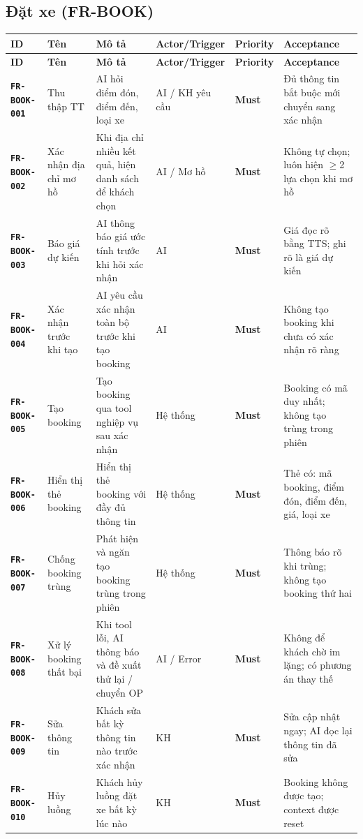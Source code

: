 \documentclass[12pt,a4paper]{article}
\newcommand{\reqid}[1]{\texttt{\textbf{\color{AloBlue}#1}}}
\newcommand{\musthave}{\colorbox{PrioMust}{\small\textbf{Must}}}
\begin{document}
\subsection{Đặt xe (FR-BOOK)}
\begin{longtable}{L{2.2cm} L{2.2cm} L{3.8cm} L{2.8cm} C{1.5cm} L{3cm}}
  \toprule{}\textbf{ID}&\textbf{Tên}&\textbf{Mô tả}&\textbf{Actor/Trigger}&\textbf{Priority}&\textbf{Acceptance}\\
  \midrule\endfirsthead\toprule{}\textbf{ID}&\textbf{Tên}&\textbf{Mô tả}&\textbf{Actor/Trigger}&\textbf{Priority}&\textbf{Acceptance}\\\midrule\endhead\bottomrule\endlastfoot
  \reqid{FR-BOOK-001} & Thu thập TT & AI hỏi điểm đón, điểm đến, loại xe & AI / KH yêu cầu & \musthave & Đủ thông tin bắt buộc mới chuyển sang xác nhận \\
  \reqid{FR-BOOK-002} & Xác nhận địa chỉ mơ hồ & Khi địa chỉ nhiều kết quả, hiện danh sách để khách chọn & AI / Mơ hồ & \musthave & Không tự chọn; luôn hiện $\geq$2 lựa chọn khi mơ hồ \\
  \reqid{FR-BOOK-003} & Báo giá dự kiến & AI thông báo giá ước tính trước khi hỏi xác nhận & AI & \musthave & Giá đọc rõ bằng TTS; ghi rõ là giá dự kiến \\
  \reqid{FR-BOOK-004} & Xác nhận trước khi tạo & AI yêu cầu xác nhận toàn bộ trước khi tạo booking & AI & \musthave & Không tạo booking khi chưa có xác nhận rõ ràng \\
  \reqid{FR-BOOK-005} & Tạo booking & Tạo booking qua tool nghiệp vụ sau xác nhận & Hệ thống & \musthave & Booking có mã duy nhất; không tạo trùng trong phiên \\
  \reqid{FR-BOOK-006} & Hiển thị thẻ booking & Hiển thị thẻ booking với đầy đủ thông tin & Hệ thống & \musthave & Thẻ có: mã booking, điểm đón, điểm đến, giá, loại xe \\
  \reqid{FR-BOOK-007} & Chống booking trùng & Phát hiện và ngăn tạo booking trùng trong phiên & Hệ thống & \musthave & Thông báo rõ khi trùng; không tạo booking thứ hai \\
  \reqid{FR-BOOK-008} & Xử lý booking thất bại & Khi tool lỗi, AI thông báo và đề xuất thử lại / chuyển OP & AI / Error & \musthave & Không để khách chờ im lặng; có phương án thay thế \\
  \reqid{FR-BOOK-009} & Sửa thông tin & Khách sửa bất kỳ thông tin nào trước xác nhận & KH & \musthave & Sửa cập nhật ngay; AI đọc lại thông tin đã sửa \\
  \reqid{FR-BOOK-010} & Hủy luồng & Khách hủy luồng đặt xe bất kỳ lúc nào & KH & \musthave & Booking không được tạo; context được reset \\
\end{longtable}
\end{document}
